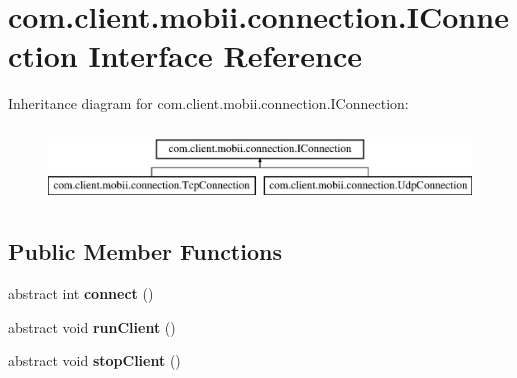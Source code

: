 \hypertarget{interfacecom_1_1client_1_1mobii_1_1connection_1_1_i_connection}{\section{com.\-client.\-mobii.\-connection.\-I\-Connection Interface Reference}
\label{interfacecom_1_1client_1_1mobii_1_1connection_1_1_i_connection}
}
Inheritance diagram for com.\-client.\-mobii.\-connection.\-I\-Connection\-:\begin{figure}[H]
\begin{center}
\leavevmode
\includegraphics[height=2.000000cm]{interfacecom_1_1client_1_1mobii_1_1connection_1_1_i_connection}
\end{center}
\end{figure}
\subsection*{Public Member Functions}
\begin{DoxyCompactItemize}
\item 
\hypertarget{interfacecom_1_1client_1_1mobii_1_1connection_1_1_i_connection_af6676fad46673f15f4becca59f3eae88}{abstract int {\bfseries connect} ()}\label{interfacecom_1_1client_1_1mobii_1_1connection_1_1_i_connection_af6676fad46673f15f4becca59f3eae88}

\item 
\hypertarget{interfacecom_1_1client_1_1mobii_1_1connection_1_1_i_connection_a2735e2403a343d1c93123ac2ae27c52c}{abstract void {\bfseries run\-Client} ()}\label{interfacecom_1_1client_1_1mobii_1_1connection_1_1_i_connection_a2735e2403a343d1c93123ac2ae27c52c}

\item 
\hypertarget{interfacecom_1_1client_1_1mobii_1_1connection_1_1_i_connection_acbb4cc398f6c46e0cd89c376c99107ce}{abstract void {\bfseries stop\-Client} ()}\label{interfacecom_1_1client_1_1mobii_1_1connection_1_1_i_connection_acbb4cc398f6c46e0cd89c376c99107ce}

\end{DoxyCompactItemize}
